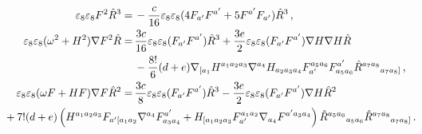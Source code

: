 \documentclass[a4paper,11pt]{article}
\begin{document}
\begin{align}
\varepsilon_8\varepsilon_8F^2\hat R^3
=&\,{}
-\frac{c}{16}\varepsilon_8\varepsilon_8(4F_{a'}F^{a'}+5F^{a'}F_{a'})\hat R^3\,,
\label{eq:e8-1}
\\
\varepsilon_8\varepsilon_8(\omega^2+H^2)\nabla F^2\hat R
=&\,{}
\frac{3c}{16}\varepsilon_8\varepsilon_8(F_{a'}F^{a'})\hat R^3
+\frac{3e}{2}\varepsilon_8\varepsilon_8(F_{a'}F^{a'})\nabla H\nabla H\hat R
\nonumber\\
&\,{}
-\frac{8!}{6}(d+e)\nabla_{[a_1}H^{a_1a_2a_3}\nabla^{a_4}H_{a_2a_3a_4}F_{a'}^{a_5a_6}F^{a'}_{a_5a_6}\hat R^{a_7a_8}{}_{a_7a_8]}\,,
\\
\varepsilon_8\varepsilon_8(\omega F+HF)\nabla F\hat R^2
=&\,
\frac{3c}{8}\varepsilon_8\varepsilon_8(F_{a'}F^{a'})\hat R^3
-\frac{3e}{2}\varepsilon_8\varepsilon_8(F_{a'}F^{a'})\nabla H\hat R^2
\nonumber\\
&{}
\hspace{-120pt}
+7!(d+e)
\left(
H^{a_1a_2a_3}F_{a'[a_1a_2}\nabla^{a_4}F^{a'}_{a_3a_4}
+H_{[a_1a_2a_3}F_{a'}^{a_1a_2}\nabla_{a_4}F^{a'a_3a_4}
\right)\hat R^{a_5a_6}{}_{a_5a_6}\hat R^{a_7a_8}{}_{a_7a_8]}\,.
\label{eq:e8-3}
\end{align}
\end{document}
